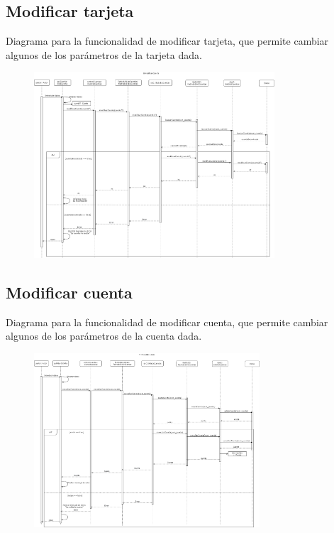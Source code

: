 \documentclass[12pt]{article}
\begin{document}
\subsection{Modificar tarjeta}
Diagrama para la funcionalidad de modificar tarjeta, que permite cambiar algunos de los parámetros de la tarjeta dada.
\begin{figure}[H]
    \centering
    \includegraphics[width=0.8\textwidth]{images/7-Gestor_modifica_tarjeta1.png}
\end{figure}
\subsection{Modificar cuenta}
Diagrama para la funcionalidad de modificar cuenta, que permite cambiar algunos de los parámetros de la cuenta dada.
\begin{figure}[H]
    \centering
    \includegraphics[width=0.75\textwidth]{images/8-Gestor_modifica_cuenta3.png}
\end{figure}
\newpage
\end{document}
